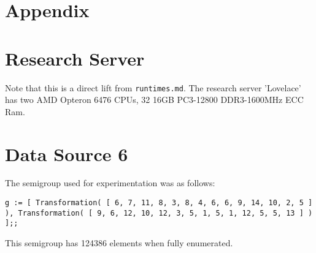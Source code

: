 \documentclass{report}
\begin{document}
\section*{Appendix}

\section*{Research Server}
Note that this is a direct lift from \texttt{runtimes.md}.
\newline
The research server 'Lovelace' has two AMD Opteron 6476 CPUs, 32 16GB PC3-12800 DDR3-1600MHz ECC Ram. 

\section*{Data Source 6}
The semigroup used for experimentation was as follows:
\begin{lstlisting}
g := [ Transformation( [ 6, 7, 11, 8, 3, 8, 4, 6, 6, 9, 14, 10, 2, 5 ] ), Transformation( [ 9, 6, 12, 10, 12, 3, 5, 1, 5, 1, 12, 5, 5, 13 ] ) ];;
\end{lstlisting}
This semigroup has 124386 elements when fully enumerated. 


\end{document}
